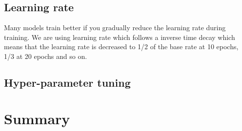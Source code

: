 \documentclass[thesis.tex]{subfiles}
\begin{document}
\subsection{Learning rate}
Many models train better if you gradually reduce the learning rate during training. We are using learning rate which follows a inverse time decay which means that the learning rate is decreased to 1/2 of the base rate at 10 epochs, 1/3 at 20 epochs and so on.



\subsection{Hyper-parameter tuning}





\section{Summary} \label{sec:C3-summary}
\end{document}
